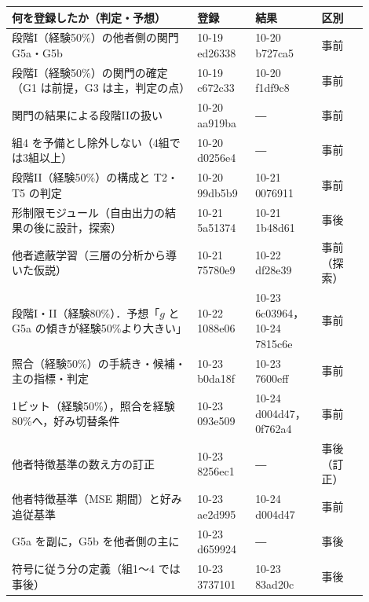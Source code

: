 \setlength{\tabcolsep}{4pt}%
\begin{tabular}{@{}p{0.48\linewidth}p{0.15\linewidth}p{0.15\linewidth}p{0.12\linewidth}@{}}
\toprule
何を登録したか（判定・予想） & 登録 & 結果 & 区別 \\
\midrule
段階I（経験50\%）の他者側の関門 G5a・G5b & 10-19 ed26338 & 10-20 b727ca5 & 事前 \\
段階I（経験50\%）の関門の確定（G1 は前提，G3 は主，判定の点） & 10-19 c672c33 & 10-20 f1df9c8 & 事前 \\
関門の結果による段階IIの扱い & 10-20 aa919ba & ― & 事前 \\
組4 を予備とし除外しない（4組では3組以上） & 10-20 d0256e4 & ― & 事前 \\
段階II（経験50\%）の構成と T2・T5 の判定 & 10-20 99db5b9 & 10-21 0076911 & 事前 \\
形制限モジュール（自由出力の結果の後に設計，探索） & 10-21 5a51374 & 10-21 1b48d61 & 事後 \\
他者遮蔽学習（三層の分析から導いた仮説） & 10-21 75780e9 & 10-22 df28e39 & 事前（探索） \\
段階I・II（経験80\%）．予想「$g$ と G5a の傾きが経験50\%より大きい」 & 10-22 1088e06 & 10-23 6c03964，10-24 7815c6e & 事前 \\
照合（経験50\%）の手続き・候補・主の指標・判定 & 10-23 b0da18f & 10-23 7600eff & 事前 \\
1ビット（経験50\%），照合を経験80\%へ，好み切替条件 & 10-23 093e509 & 10-24 d004d47，0f762a4 & 事前 \\
他者特徴基準の数え方の訂正 & 10-23 8256ec1 & ― & 事後（訂正） \\
他者特徴基準（MSE 期間）と好み追従基準 & 10-23 ae2d995 & 10-24 d004d47 & 事前 \\
G5a を副に，G5b を他者側の主に & 10-23 d659924 & ― & 事後 \\
符号に従う分の定義（組1〜4 では事後） & 10-23 3737101 & 10-23 83ad20c & 事後 \\

\end{tabular}
